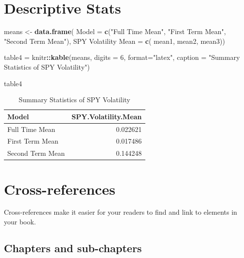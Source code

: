 \documentclass[
]{book}
\newenvironment{Shaded}{\begin{snugshade}}{\end{snugshade}}
\newcommand{\AttributeTok}[1]{\textcolor[rgb]{0.13,0.29,0.53}{#1}}
\newcommand{\DecValTok}[1]{\textcolor[rgb]{0.00,0.00,0.81}{#1}}
\newcommand{\FunctionTok}[1]{\textcolor[rgb]{0.13,0.29,0.53}{\textbf{#1}}}
\newcommand{\NormalTok}[1]{#1}
\newcommand{\OtherTok}[1]{\textcolor[rgb]{0.56,0.35,0.01}{#1}}
\newcommand{\SpecialCharTok}[1]{\textcolor[rgb]{0.81,0.36,0.00}{\textbf{#1}}}
\newcommand{\StringTok}[1]{\textcolor[rgb]{0.31,0.60,0.02}{#1}}
\begin{document}
\chapter{Descriptive Stats}\label{descriptive-stats}

\begin{Shaded}
\begin{Highlighting}[]
\NormalTok{means }\OtherTok{\textless{}{-}} \FunctionTok{data.frame}\NormalTok{(}
  \AttributeTok{Model =} \FunctionTok{c}\NormalTok{(}\StringTok{"Full Time Mean"}\NormalTok{, }\StringTok{"First Term Mean"}\NormalTok{, }\StringTok{"Second Term Mean"}\NormalTok{),}
  \StringTok{\textasciigrave{}}\AttributeTok{SPY Volatility Mean}\StringTok{\textasciigrave{}} \OtherTok{=} \FunctionTok{c}\NormalTok{(}
\NormalTok{    mean1,}
\NormalTok{    mean2,}
\NormalTok{    mean3))}

\NormalTok{table4 }\OtherTok{=}\NormalTok{ knitr}\SpecialCharTok{::}\FunctionTok{kable}\NormalTok{(means, }\AttributeTok{digits =} \DecValTok{6}\NormalTok{, }\AttributeTok{format=}\StringTok{"latex"}\NormalTok{,}
             \AttributeTok{caption =} \StringTok{"Summary Statistics of SPY Volatility"}\NormalTok{)}

\NormalTok{table4}
\end{Highlighting}
\end{Shaded}

\begin{table}

\caption{\label{tab:means}Summary Statistics of SPY Volatility}
\centering
\begin{tabular}[t]{l|r}
\hline
Model & SPY.Volatility.Mean\\
\hline
Full Time Mean & 0.022621\\
\hline
First Term Mean & 0.017486\\
\hline
Second Term Mean & 0.144248\\
\hline
\end{tabular}
\end{table}

\chapter{Cross-references}\label{cross}

Cross-references make it easier for your readers to find and link to elements in your book.

\section{Chapters and sub-chapters}\label{chapters-and-sub-chapters}
\end{document}
